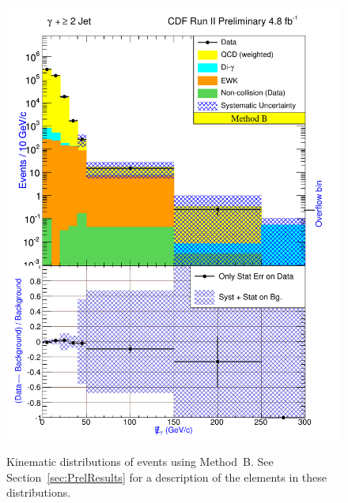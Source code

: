 \documentclass[12pt,twoside,letterpaper,doublespace]{article}
\begin{document}
\begin{figure}[h!]
\centering
\caption[Method B \photwojet]{Kinematic distributions of \photwojet events using \mbox{Method B}. See Section~\ref{sec:PrelResults} for a description of the elements in these distributions.}
{\includegraphics[keepaspectratio=true, scale=\figScale]{G30Jets_MtdB_plot2_Met.pdf}}
\label{fig:pjMtdBSetFour}
\end{figure}
\clearpage

\end{document}
